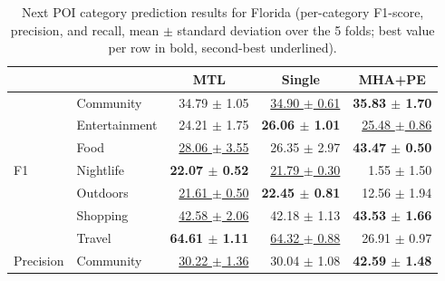 \begin{table}[htbp]
\caption{Next POI category prediction results for Florida (per-category F1-score, precision, and recall, mean $\pm$ standard deviation over the 5 folds; best value per row in bold, second-best underlined).}
\label{tab:cbic:next}
\centering
\begin{tabular}{llrrr}
\toprule
 & & \multicolumn{1}{c}{\textbf{MTL}} & \multicolumn{1}{c}{\textbf{Single}} & \multicolumn{1}{c}{\textbf{MHA+PE}} \\
\midrule
\multirow{7}{*}{F1}        & Community     & 34.79 $\pm$ 1.05             & \underline{34.90 $\pm$ 0.61} & \textbf{35.83 $\pm$ 1.70} \\
                           & Entertainment & 24.21 $\pm$ 1.75             & \textbf{26.06 $\pm$ 1.01}    & \underline{25.48 $\pm$ 0.86} \\
                           & Food          & \underline{28.06 $\pm$ 3.55} & 26.35 $\pm$ 2.97             & \textbf{43.47 $\pm$ 0.50} \\
                           & Nightlife     & \textbf{22.07 $\pm$ 0.52}    & \underline{21.79 $\pm$ 0.30} & 1.55 $\pm$ 1.50 \\
                           & Outdoors      & \underline{21.61 $\pm$ 0.50} & \textbf{22.45 $\pm$ 0.81}    & 12.56 $\pm$ 1.94 \\
                           & Shopping      & \underline{42.58 $\pm$ 2.06} & 42.18 $\pm$ 1.13             & \textbf{43.53 $\pm$ 1.66} \\
                           & Travel        & \textbf{64.61 $\pm$ 1.11}    & \underline{64.32 $\pm$ 0.88} & 26.91 $\pm$ 0.97 \\
\midrule
\multirow{7}{*}{Precision} & Community     & \underline{30.22 $\pm$ 1.36} & 30.04 $\pm$ 1.08             & \textbf{42.59 $\pm$ 1.48} \\

\end{tabular}
\end{table}

